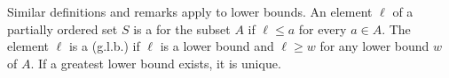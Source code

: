 Similar definitions and remarks apply to lower bounds. An element $\ell$ of a partially ordered set $S$ is a  for the subset $A$ if $\ell \leq a$ for every $a \in A$. The element $\ell$ is a  (g.l.b.) if $\ell$ is a lower bound and $\ell \geq w$ for any lower bound $w$ of $A$. If a greatest lower bound exists, it is unique.

